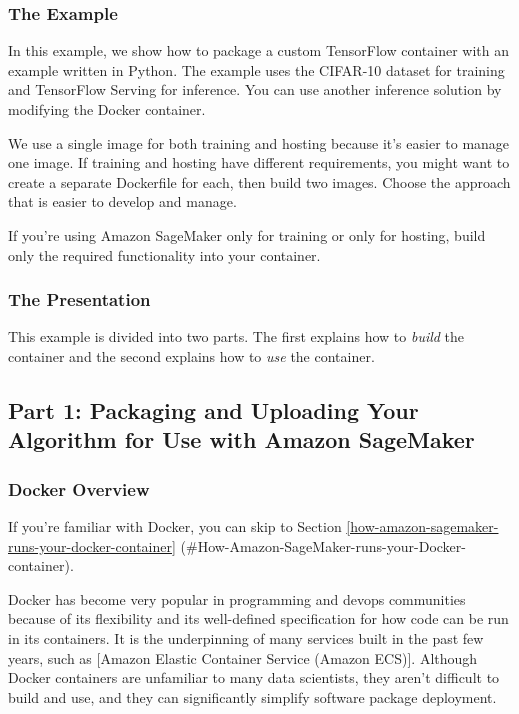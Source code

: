 \documentclass[11pt]{article}
\begin{document}
\subsubsection{The Example}\label{the-example}

In this example, we show how to package a custom TensorFlow container
with an example written in Python. The example uses the CIFAR-10 dataset
for training and TensorFlow Serving for inference. You can use another
inference solution by modifying the Docker container.

We use a single image for both training and hosting because it's easier
to manage one image. If training and hosting have different
requirements, you might want to create a separate Dockerfile for each,
then build two images. Choose the approach that is easier to develop and
manage.

If you're using Amazon SageMaker only for training or only for hosting,
build only the required functionality into your container.

\subsubsection{The Presentation}\label{the-presentation}

This example is divided into two parts. The first explains how to
\emph{build} the container and the second explains how to \emph{use} the
container.

    \subsection{Part 1: Packaging and Uploading Your Algorithm for Use with
Amazon
SageMaker}\label{part-1-packaging-and-uploading-your-algorithm-for-use-with-amazon-sagemaker}

\subsubsection{Docker Overview}\label{docker-overview}

If you're familiar with Docker, you can skip to
Section \ref{how-amazon-sagemaker-runs-your-docker-container}
(\#How-Amazon-SageMaker-runs-your-Docker-container).

Docker has become very popular in programming and devops communities
because of its flexibility and its well-defined specification for how
code can be run in its containers. It is the underpinning of many
services built in the past few years, such as {[}Amazon Elastic
Container Service (Amazon ECS){]}. Although Docker containers are
unfamiliar to many data scientists, they aren't difficult to build and
use, and they can significantly simplify software package deployment.
\end{document}
